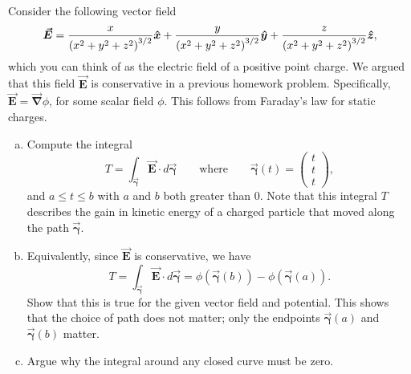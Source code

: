 \documentclass[12pt]{article} %
\newcommand{\grad}{\boldsymbol{\vec{\nabla}}}
\newcommand{\curvegamma}{\boldsymbol{\vec{\gamma}}}
\newcommand{\vecfieldE}{\boldsymbol{\vec{E}}}
\begin{document}
\begin{solution}
\begin{enumerate}[(a)]
\begin{figure}[H]
    \end{figure}        
\end{enumerate}
\end{solution}

\newpage
\begin{problem}
    Consider the following vector field
    \[
    \vecfieldE = \frac{x}{\left(x^2+y^2+z^2\right)^{3/2}} \xhat + \frac{y}{\left(x^2+y^2+z^2\right)^{3/2}} \yhat + \frac{z}{\left(x^2+y^2+z^2\right)^{3/2}} \zhat,
    \]
    which you can think of as the electric field of a positive point charge.  We argued that this field $\vecfieldE$ is conservative in a previous homework problem. Specifically, $\vecfieldE = \grad \phi$, for some scalar field $\phi$. This follows from Faraday's law for static charges.
    \begin{enumerate}[(a)]
        \item Compute the integral
        \[
        T=\int_{\curvegamma} \vecfieldE \cdot d\curvegamma \qquad \textrm{where} \qquad \curvegamma(t) = \begin{pmatrix} t \\ t \\ t \end{pmatrix},
        \]
        and $a\leq t \leq b$ with $a$ and $b$ both greater than 0.  Note that this integral $T$ describes the gain in kinetic energy of a charged particle that moved along the path $\curvegamma$. 
        \item Equivalently, since $\vecfieldE$ is conservative, we have
        \[
        T=\int_{\curvegamma} \vecfieldE \cdot d\curvegamma = \phi(\curvegamma(b))-\phi(\curvegamma(a)).
        \]
        Show that this is true for the given vector field and potential. This shows that the choice of path does not matter; only the endpoints $\curvegamma(a)$ and $\curvegamma(b)$ matter.
        \item Argue why the integral around any closed curve must be zero.
    \end{enumerate}
\end{problem}
\end{document}
